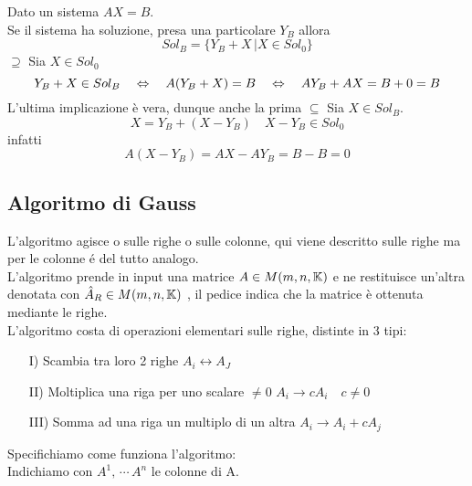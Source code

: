 \spazio
\begin{prop}Dato un sistema $AX=B$.\\
Se il sistema ha soluzione, presa una particolare $Y_B$ allora 
$$ Sol_B= \{ Y_B + X \, \vert X \in Sol_0 \} $$
\proof $\supseteq$ Sia $X \in Sol_0 $  
$$ Y_B+X \in Sol_B \quad \Leftrightarrow \quad A ( Y_B + X )=B \quad \Leftrightarrow \quad AY_B +AX=B+0=B$$
L'ultima implicazione \`e vera, dunque anche la prima
\proof $\subseteq$ Sia $X \in Sol_B $.\\
$$X=Y_B + ( X- Y_B) \quad X-Y_B\in Sol_0 $$
infatti $$ A ( X-Y_B)= AX- AY_B=B-B=0 $$
\endproof
\end{prop}
\subsection{Algoritmo di Gauss}

L'algoritmo agisce o sulle righe o sulle colonne, qui viene descritto sulle righe ma per le colonne é del tutto analogo.\\
L'algoritmo prende in input una matrice $ A \in M(m,n, \mathbb{K}) $ e ne restituisce un'altra denotata con $\hat{A}_R \in M(m,n,\mathbb{K})$ , il pedice indica che la matrice è ottenuta mediante le righe.\\
L'algoritmo costa di operazioni elementari sulle righe, distinte in 3 tipi:
\begin{itemize}
    \item [I)] Scambia tra loro 2 righe $A_i \leftrightarrow  A_J$
    \item[II)] Moltiplica una riga per uno scalare $ \neq 0 $  $ A_i \rightarrow c A_i \quad c \neq 0$
    \item[III)]	Somma ad una riga un multiplo di un altra $ A_i \rightarrow A_i + c A_j$
\end{itemize}
\spazio
Specifichiamo come funziona l'algoritmo:\\
Indichiamo con $A^1, \, \cdots \, A^n$ le colonne di A.\\

